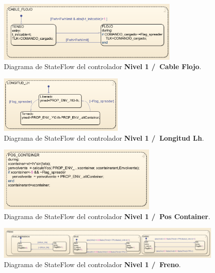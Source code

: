 \documentclass[11pt]{article}
\begin{document}
\begin{figure}
	\centering
	\includegraphics[width=0.8\textwidth]{images/imagen_20_nivel_1_cable_flojo.png}
	\caption{Diagrama de StateFlow del controlador \textbf{Nivel 1 /\ Cable Flojo}.}
	\label{fig:nivel_1_cable_flojo}
\end{figure}

\begin{figure}
	\centering
	\includegraphics[width=0.55\textwidth]{images/imagen_21_nivel_1_longitud_lh.png}
	\caption{Diagrama de StateFlow del controlador \textbf{Nivel 1 /\ Longitud Lh}.}
	\label{fig:nivel_1_longitud_lh}
\end{figure}

\begin{figure}
	\centering
	\includegraphics[width=0.7\textwidth]{images/imagen_22_nivel_1_pos_container.png}
	\caption{Diagrama de StateFlow del controlador \textbf{Nivel 1 /\ Pos Container}.}
	\label{fig:nivel_1_pos_container}
\end{figure}

\begin{figure}
	\centering
	\includegraphics[width=1\textwidth]{images/imagen_23_nivel_1_freno.png}
	\caption{Diagrama de StateFlow del controlador \textbf{Nivel 1 /\ Freno}.}
	\label{fig:nivel_1_freno}
\end{figure}
\end{document}
